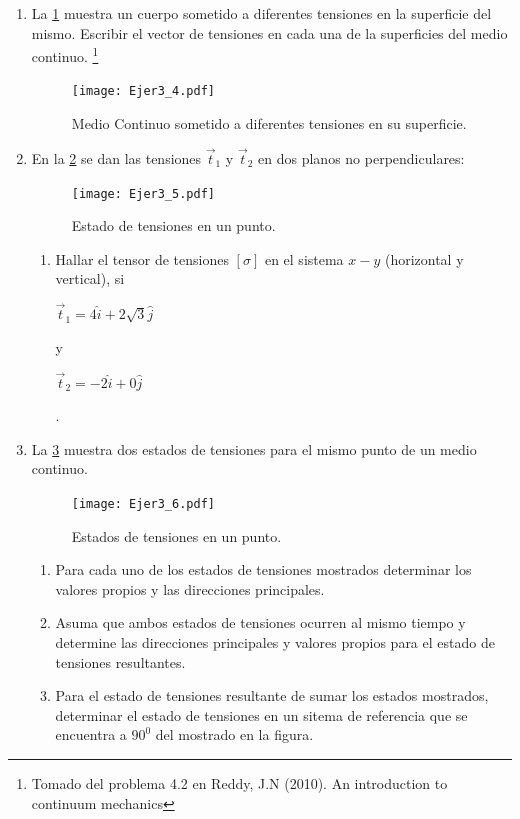 \documentclass[../notas medios.tex]{subfiles}
\begin{document}
\begin{enumerate}
\item \label{punto04} La  \cref{caras} muestra un cuerpo sometido a
diferentes tensiones en la superficie del mismo. Escribir el vector de tensiones
en cada una de la superficies del medio continuo. \footnote{Tomado del problema 4.2 en Reddy, J.N (2010). An introduction to continuum mechanics}
%
\begin{figure}[H]
	\centering
	\texttt{[image: Ejer3\_4.pdf]}
	\caption{Medio Continuo sometido a diferentes tensiones en su superficie.}
	\label{caras}
\end{figure}	
\item \label{punto05} En la  \cref{cuna:tensiones} se dan las tensiones
$\vec{t}_1$ y $\vec{t}_2$ en dos planos no perpendiculares:\\
%	
\begin{figure}[H]
	\centering
	\texttt{[image: Ejer3\_5.pdf]}
	\caption{Estado de tensiones en un punto.}
	\label{cuna:tensiones}
\end{figure}
\begin{enumerate}
	\item Hallar el tensor de tensiones $[\sigma]$ en el sistema $x-y$ (horizontal y vertical), si \begin{large} $\vec{t}_1= 4 \hat{i} + 2 \sqrt{3} \hat{j}$ \end{large} y  \begin{large} $\vec{t}_2= -2 \hat{i} +0 \hat{j}$ \end{large}.\\
\end{enumerate}
\item \label{punto06} La \cref{direcc} muestra dos estados de tensiones
para el mismo punto de un medio continuo. 
%
\begin{figure}[H]
	\centering
	\texttt{[image: Ejer3\_6.pdf]}
	\caption{Estados de tensiones en un punto.}
	\label{direcc}
\end{figure}
%
\begin{enumerate}
	\item Para cada uno de los estados de tensiones mostrados determinar los
valores propios y las direcciones principales.
	\item Asuma que ambos estados de tensiones ocurren al mismo tiempo y determine
las direcciones principales y valores propios para el estado de tensiones resultantes.
	\item Para el estado de tensiones resultante de sumar los estados mostrados,
determinar el estado de tensiones en un sitema de referencia que se encuentra a $90^0$ del mostrado en la figura.

\end{enumerate}
\end{enumerate}
\end{document}
